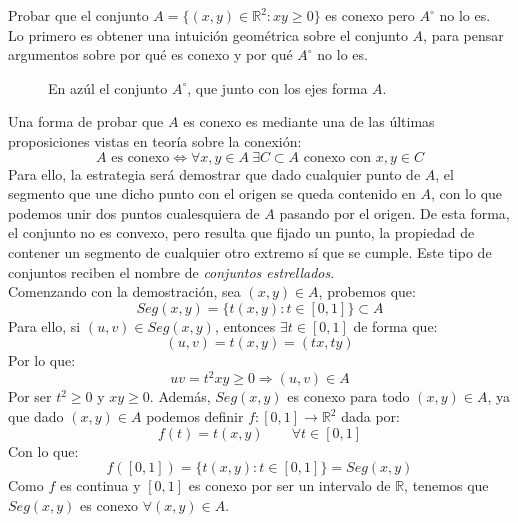 \begin{ejercicio}
Probar que el conjunto \( A = \{ (x,y) \in \mathbb{R}^2 : xy \geq 0 \} \) es conexo pero \( A^\circ \) no lo es.\\

\noindent
Lo primero es obtener una intuición geométrica sobre el conjunto $A$, para pensar argumentos sobre por qué es conexo y por qué $A^\circ$ no lo es.
\begin{figure}[H]
    \centering
{}
    \caption{En azúl el conjunto $A^\circ$, que junto con los ejes forma $A$.}
\end{figure}
Una forma de probar que $A$ es conexo es mediante una de las últimas proposiciones vistas en teoría sobre la conexión:
\begin{equation*}
    A \text{\ es conexo} \Longleftrightarrow \forall x,y\in A~\exists C\subset A \text{\ conexo con\ } x,y\in C
\end{equation*}
Para ello, la estrategia será demostrar que dado cualquier punto de $A$, el segmento que une dicho punto con el origen se queda contenido en $A$, con lo que podemos unir dos puntos cualesquiera de $A$ pasando por el origen. De esta forma, el conjunto no es convexo, pero resulta que fijado un punto, la propiedad de contener un segmento de cualquier otro extremo sí que se cumple. Este tipo de conjuntos reciben el nombre de \textit{conjuntos estrellados}.\\

\noindent
Comenzando con la demostración, sea $(x,y)\in A$, probemos que:
\begin{equation*}
    Seg(x,y) = \{t(x,y) : t\in [0,1]\} \subset A
\end{equation*}
Para ello, si $(u,v)\in Seg(x,y)$, entonces $\exists t\in [0,1]$ de forma que:
\begin{equation*}
    (u,v) = t(x,y) = (tx,ty)
\end{equation*}
Por lo que:
\begin{equation*}
    uv = t^2xy \geq 0 \Longrightarrow (u,v) \in A
\end{equation*}
Por ser $t^2 \geq 0 $ y $xy \geq 0$. Además, $Seg(x,y)$ es conexo para todo $(x,y)\in A$, ya que dado $(x,y)\in A$ podemos definir $f:[0,1]\to \mathbb{R}^2$ dada por:
\begin{equation*}
    f(t) = t(x,y) \qquad \forall t\in [0,1]
\end{equation*}
Con lo que:
\begin{equation*}
    f([0,1]) = \{t(x,y) : t\in [0,1]\} = Seg(x,y)
\end{equation*}
Como $f$ es continua y $[0,1]$ es conexo por ser un intervalo de $\mathbb{R}$, tenemos que $Seg(x,y)$ es conexo $\forall (x,y)\in A$.\\


\end{ejercicio}
